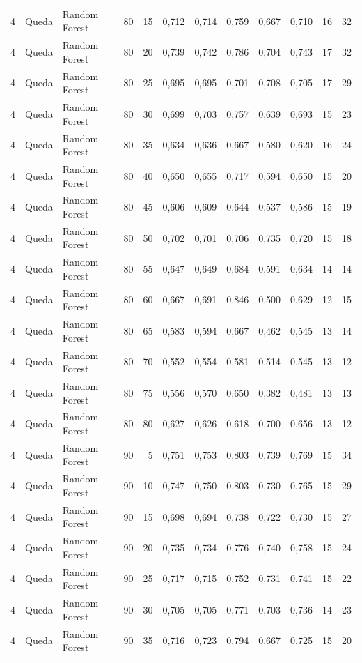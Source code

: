 \begin{longtable}{@{}rllrrrrrrrrr@{}}
4 & Queda & Random Forest & 80 & 15 & 0,712 & 0,714 & 0,759 & 0,667 & 0,710 & 16 & 32 \\
4 & Queda & Random Forest & 80 & 20 & 0,739 & 0,742 & 0,786 & 0,704 & 0,743 & 17 & 32 \\
4 & Queda & Random Forest & 80 & 25 & 0,695 & 0,695 & 0,701 & 0,708 & 0,705 & 17 & 29 \\
4 & Queda & Random Forest & 80 & 30 & 0,699 & 0,703 & 0,757 & 0,639 & 0,693 & 15 & 23 \\
4 & Queda & Random Forest & 80 & 35 & 0,634 & 0,636 & 0,667 & 0,580 & 0,620 & 16 & 24 \\
4 & Queda & Random Forest & 80 & 40 & 0,650 & 0,655 & 0,717 & 0,594 & 0,650 & 15 & 20 \\
4 & Queda & Random Forest & 80 & 45 & 0,606 & 0,609 & 0,644 & 0,537 & 0,586 & 15 & 19 \\
4 & Queda & Random Forest & 80 & 50 & 0,702 & 0,701 & 0,706 & 0,735 & 0,720 & 15 & 18 \\
4 & Queda & Random Forest & 80 & 55 & 0,647 & 0,649 & 0,684 & 0,591 & 0,634 & 14 & 14 \\
4 & Queda & Random Forest & 80 & 60 & 0,667 & 0,691 & 0,846 & 0,500 & 0,629 & 12 & 15 \\
4 & Queda & Random Forest & 80 & 65 & 0,583 & 0,594 & 0,667 & 0,462 & 0,545 & 13 & 14 \\
4 & Queda & Random Forest & 80 & 70 & 0,552 & 0,554 & 0,581 & 0,514 & 0,545 & 13 & 12 \\
4 & Queda & Random Forest & 80 & 75 & 0,556 & 0,570 & 0,650 & 0,382 & 0,481 & 13 & 13 \\
4 & Queda & Random Forest & 80 & 80 & 0,627 & 0,626 & 0,618 & 0,700 & 0,656 & 13 & 12 \\
4 & Queda & Random Forest & 90 & 5 & 0,751 & 0,753 & 0,803 & 0,739 & 0,769 & 15 & 34 \\
4 & Queda & Random Forest & 90 & 10 & 0,747 & 0,750 & 0,803 & 0,730 & 0,765 & 15 & 29 \\
4 & Queda & Random Forest & 90 & 15 & 0,698 & 0,694 & 0,738 & 0,722 & 0,730 & 15 & 27 \\
4 & Queda & Random Forest & 90 & 20 & 0,735 & 0,734 & 0,776 & 0,740 & 0,758 & 15 & 24 \\
4 & Queda & Random Forest & 90 & 25 & 0,717 & 0,715 & 0,752 & 0,731 & 0,741 & 15 & 22 \\
4 & Queda & Random Forest & 90 & 30 & 0,705 & 0,705 & 0,771 & 0,703 & 0,736 & 14 & 23 \\
4 & Queda & Random Forest & 90 & 35 & 0,716 & 0,723 & 0,794 & 0,667 & 0,725 & 15 & 20 \\

\end{longtable}
